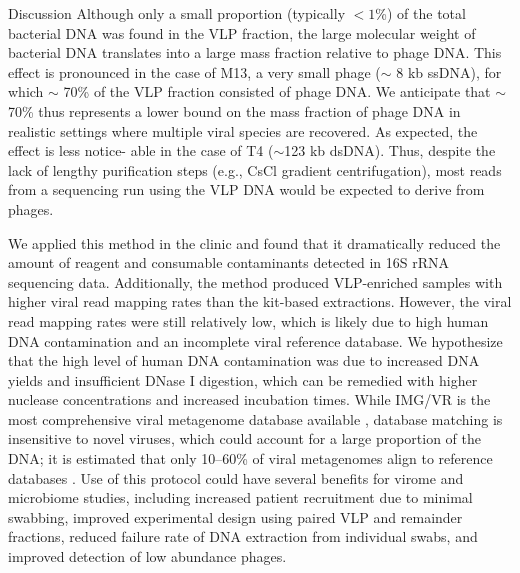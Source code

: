 \documentclass[oneside,12pt,final]{sty/ucthesis-CA2012}
\begin{document}
\begin{mainmatter}
\begin{section}{Discussion}
Although only a small proportion (typically $<1$\%) of the total bacterial DNA was found in the VLP fraction, the large molecular weight of bacterial DNA translates into a large mass fraction relative to phage DNA. This effect is pronounced in the case of M13, a very small phage ($\sim$ 8 kb ssDNA), for which $\sim$ 70\% of the VLP fraction consisted of phage DNA. We anticipate that $\sim$ 70\% thus represents a lower bound on the mass fraction of phage DNA in realistic settings where multiple viral species are recovered. As expected, the effect is less notice- able in the case of T4 ($\sim$123 kb dsDNA). Thus, despite the lack of lengthy purification steps (e.g., CsCl gradient centrifugation), most reads from a sequencing run using the VLP DNA would be expected to derive from phages.

We applied this method in the clinic and found that it dramatically reduced the amount of reagent and consumable contaminants detected in 16S rRNA sequencing data. Additionally, the method produced VLP-enriched samples with higher viral read mapping rates than the kit-based extractions. However, the viral read mapping rates were still relatively low, which is likely due to high human DNA contamination and an incomplete viral reference database. We hypothesize that the high level of human DNA contamination was due to increased DNA yields and insufficient DNase I digestion, which can be remedied with higher nuclease concentrations and increased incubation times. While IMG/VR is the most comprehensive viral metagenome database available \cite{RN78}, database matching is insensitive to novel viruses, which could account for a large proportion of the DNA; it is estimated that only 10–60\% of viral metagenomes align to reference databases \cite{RN79, RN80}. Use of this protocol could have several benefits for virome and microbiome studies, including increased patient recruitment due to minimal swabbing, improved experimental design using paired VLP and remainder fractions, reduced failure rate of DNA extraction from individual swabs, and improved detection of low abundance phages.

\end{section}


\end{mainmatter}
\end{document}

